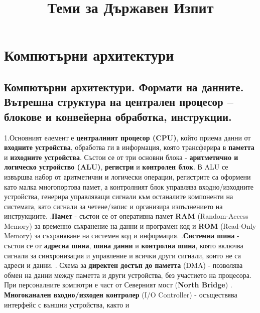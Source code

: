 \documentclass{article}
\begin{document}
\title{Теми за Държавен Изпит}
\author{}
\maketitle

\section*{Компютърни архитектури}

\subsection*{Компютърни архитектури. Формати на данните. Вътрешна структура на централен процесор – блокове и конвейерна
обработка, инструкции.}

1.Основният елемент е \textbf{централният процесор (CPU)}, който приема данни от \textbf{входните устройства},
обработва ги в информация, която трансферира в \textbf{паметта} и \textbf{изходните устройства}. Състои се от
три основни блока - \textbf{аритметично и логическо устройство (ALU)}, \textbf{регистри} и \textbf{контролен блок}.
В ALU се извършва набор от аритметични и логически операции, регистрите са оформени като малка многопортова памет,
а контролният блок управлява входно/изходните устройства, генерира управляващи сигнали към останалите компоненти
на системата, като сигнали за четене/запис и организира изпълнението на инструкциите. \newline{}.\textbf{Памет} - състои се от оперативна памет \textbf{RAM} (Random-Access Memory) за временно съхранение
на данни и програмен код и \textbf{ROM} (Read-Only Memory) за съхраняване на системен код и информация. \newline{}.\textbf{Системна шина} - състои се от \textbf{адресна шина}, \textbf{шина данни} и \textbf{контролна шина},
която включва сигнали за синхронизация и управление и всички други сигнали, които не са адреси и данни. \newline{}. Схема за \textbf{директен достъп до паметта} (DMA) - позволява обмен на данни между паметта и други
устройства, без участието на процесора. При персоналните компютри е част от Северният мост (\textbf{North Bridge}) \newline{}. \textbf{Многоканален входно/изходен контролер} (I/O Controller) - осъществява интерфейс с външни устройства, както и
\end{document}
